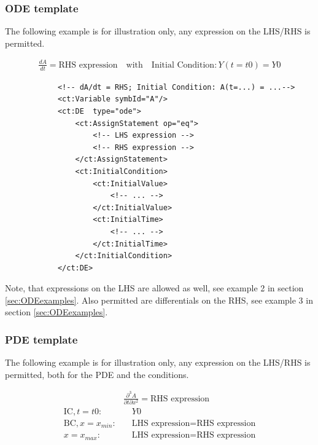 \subsubsection*{ODE template}
The following example is for illustration only, any expression on the LHS/RHS is permitted. 

\begin{align}
\frac{dA}{dt}  = \text{RHS expression} \quad \text{with} \quad \text{Initial Condition}: Y(t\!=\!t0)\!=\!Y0 \nonumber
\end{align}

\lstset{language=XML}
\begin{lstlisting}
            <!-- dA/dt = RHS; Initial Condition: A(t=...) = ...-->
            <ct:Variable symbId="A"/>
            <ct:DE  type="ode">
                <ct:AssignStatement op="eq">
                    <!-- LHS expression -->
                    <!-- RHS expression -->
                </ct:AssignStatement>
                <ct:InitialCondition>
                    <ct:InitialValue>
                        <!-- ... -->
                    </ct:InitialValue>
                    <ct:InitialTime>
                        <!-- ... -->
                    </ct:InitialTime>
                </ct:InitialCondition>
            </ct:DE>
\end{lstlisting}
Note, that expressions on the LHS are allowed as well, see example 2
in section \ref{sec:ODEexamples}. Also permitted are differentials
on the RHS, see example 3 in section \ref{sec:ODEexamples}.

\bigskip
\subsubsection*{PDE template}
The following example is for illustration only, any expression on the LHS/RHS is permitted,
both for the PDE and the conditions.

\begin{align}
& \frac{\partial^3 A}{\partial t\partial x^2}  = \text{RHS expression}  \nonumber \\
\text{IC}, t=t0: & \quad Y0 \nonumber \\
\text{BC}, x=x_{min}: & \quad \text{LHS expression}\!=\!\text{RHS expression} \nonumber \\
	x=x_{max}: & \quad \text{LHS expression}\!=\!\text{RHS expression} \nonumber
\end{align}

